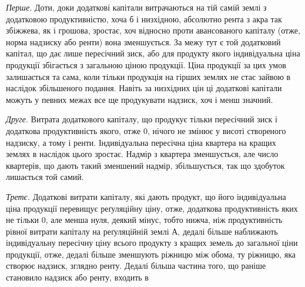 \emph{Перше.} Доти, доки додаткові капітали витрачаються на тій самій землі
з додатковою продуктивністю, хоча б і низхідною, абсолютно рента з акра
так збіжжева, як і грошова, зростає, хоч відносно проти авансованого капіталу
(отже, норма надзиску або ренти) вона зменшується. За межу тут є той додатковий
капітал, що дає лише пересічний зиск, або для продукту якого індивідуальна
ціна продукції збігається з загальною ціною продукції. Ціна продукції
за цих умов залишається та сама, коли тільки продукція на гірших землях
не стає зайвою в наслідок збільшеного подання. Навіть за низхідних цін ці
додаткові капітали можуть у певних межах все ще продукувати надзиск, хоч
і менш значний.

\emph{Друге.} Витрата додаткового капіталу, що продукує тільки пересічний
зиск і додаткова продуктивність якого, отже \deq{} 0, нічого не змінює у висоті
створеного надзиску, а тому і ренти. Індивідуальна пересічна ціна квартера на
кращих землях в наслідок цього зростає. Надмір з квартера зменшується, але
число квартерів, що дають такий зменшений надмір, збільшується, так що здобуток
лишається той самий.

\emph{Третє.} Додаткові витрати капіталу, які дають продукт, що його індивідуальна
ціна продукції перевищує реґуляційну ціну, отже, додаткова продуктивність
яких не тільки \deq{} 0, але менша нуля, деякий мінус, тобто нижча,
ніж продуктивність рівної витрати капіталу на реґуляційній землі $А$, дедалі
більше наближають індивідуальну пересічну ціну всього продукту з кращих
земель до загальної ціни продукції, отже, дедалі більше зменшують ріжницю
між обома, ту ріжницю, яка створює надзиск, зглядно ренту. Дедалі
більша частина того, що раніше становило надзиск або ренту, входить в
\parbreak{}  %
